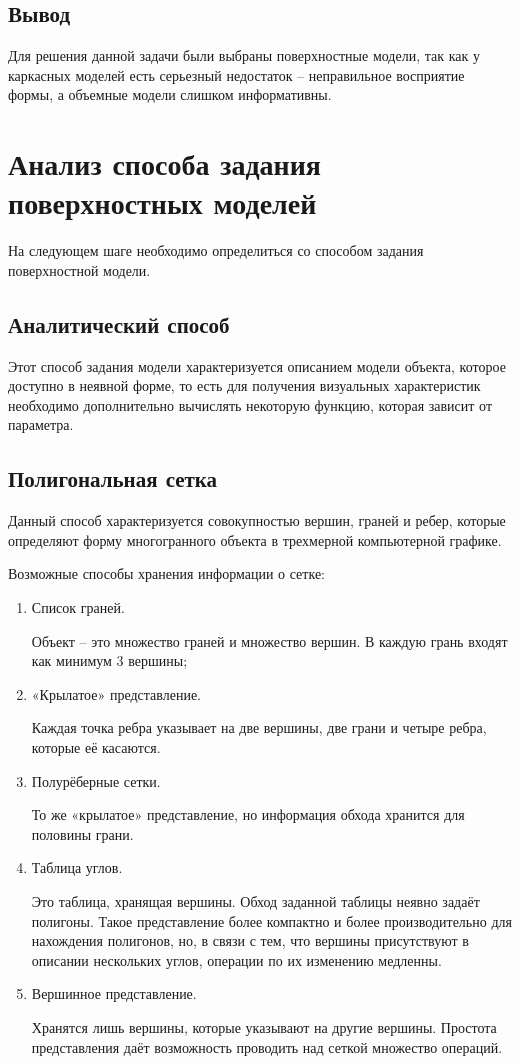 \subsection*{Вывод}	
Для решения данной задачи были выбраны поверхностные модели, так как у каркасных моделей есть серьезный недостаток – неправильное восприятие формы, а объемные модели слишком информативны.

\section{Анализ способа задания поверхностных моделей}
На следующем шаге необходимо определиться со способом задания поверхностной модели.

\subsection{Аналитический способ}

 Этот способ задания модели характеризуется описанием модели объекта, которое доступно в неявной форме, то есть для получения визуальных характеристик необходимо дополнительно вычислять некоторую функцию, которая зависит от параметра.

\subsection{Полигональная сетка}

 Данный способ характеризуется совокупностью вершин, граней и ребер, которые определяют форму многогранного объекта в трехмерной компьютерной графике.

Возможные способы хранения информации о сетке:

\begin{enumerate}

\item Список граней. 

Объект – это множество граней и множество вершин. В каждую грань входят как минимум 3 вершины;
\item«Крылатое» представление. 

Каждая точка ребра указывает на две вершины, две грани и четыре ребра, которые её касаются.

\item Полурёберные сетки.

 То же «крылатое» представление, но информация обхода хранится для половины грани.
 
\item Таблица углов.

 Это таблица, хранящая вершины. Обход заданной таблицы неявно задаёт полигоны. Такое представление более компактно и более производительно для нахождения полигонов, но, в связи с тем, что вершины присутствуют в описании нескольких углов, операции по их изменению медленны.
 
\item Вершинное представление.

 Хранятся лишь вершины, которые указывают на другие вершины. Простота представления даёт возможность проводить над сеткой множество операций.

\end{enumerate}

